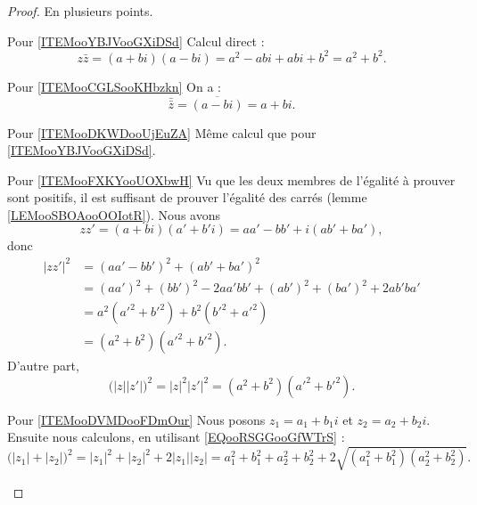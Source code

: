 \begin{proof}
    En plusieurs points.
    \begin{subproof}
    \item[Pour \ref{ITEMooYBJVooGXiDSd}]
        Calcul direct :
        \begin{equation}
            z\bar z=(a+bi)(a-bi)=a^2-abi+abi+b^2=a^2+b^2.
        \end{equation}
    \item[Pour \ref{ITEMooCGLSooKHbzkn}]
        On a :
        \begin{equation}
            \bar{\bar z}=\overline{ (a-bi) }=a+bi.
        \end{equation}
    \item[Pour \ref{ITEMooDKWDooUjEuZA}]
        Même calcul que pour \ref{ITEMooYBJVooGXiDSd}.
    \item[Pour \ref{ITEMooFXKYooUOXbwH}]
        Vu que les deux membres de l'égalité à prouver sont positifs, il est suffisant de prouver l'égalité des carrés (lemme \ref{LEMooSBOAooOOIotR}). Nous avons
        \begin{equation}
            zz'=(a+bi)(a'+b'i)=aa'-bb'+i(ab'+ba'),
        \end{equation}
        donc
        \begin{subequations}
            \begin{align}
                | zz' |^2&=(aa'-bb')^2+(ab'+ba')^2\\
                &=(aa')^2+(bb')^2-2aa'bb'+(ab')^2+(ba')^2+2ab'ba'\\
                &=a^2(a'^2+b'^2)+b^2(b'^2+a'^2)\\
                &=(a^2+b^2)(a'^2+b'^2).
            \end{align}
        \end{subequations}
        D'autre part,
        \begin{equation}        \label{EQooRSGGooGfWTrS}
            \big( | z | |z' | \big)^2=| z |^2| z' |^2=(a^2+b^2)(a'^2+b'^2).
        \end{equation}
    \item[Pour \ref{ITEMooDVMDooFDmOur}]
        Nous posons \( z_1=a_1+b_1i\) et \( z_2=a_2+b_2i\). Ensuite nous calculons, en utilisant \eqref{EQooRSGGooGfWTrS} :
        \begin{equation}
            \big( | z_1 |+| z_2 | \big)^2=| z_1 |^2+| z_2 |^2+2| z_1 | |z_2 |=a_1^2+b_1^2+a_2^2+b_2^2+2\sqrt{ (a_1^2+b_1^2)(a_2^2+b_2^2) }.
        \end{equation}

\end{subproof}
\end{proof}
